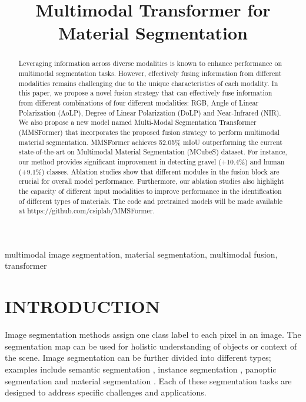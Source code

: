 \documentclass{article}
\title{Multimodal Transformer for Material Segmentation}
\begin{document}
\maketitle


\begin{abstract}
Leveraging information across diverse modalities is known to enhance performance on multimodal segmentation tasks. However, effectively fusing information from different modalities remains challenging due to the unique characteristics of each modality. In this paper, we propose a novel fusion strategy that can effectively fuse information from different combinations of four different modalities: RGB, Angle of Linear Polarization (AoLP), Degree of Linear Polarization (DoLP) and Near-Infrared (NIR). We also propose a new model named Multi-Modal Segmentation Transformer (MMSFormer) that incorporates the proposed fusion strategy to perform multimodal material segmentation. MMSFormer achieves 52.05\% mIoU outperforming the current state-of-the-art on Multimodal Material Segmentation (MCubeS) dataset. For instance, our method provides significant improvement in detecting gravel (+10.4\%) and human (+9.1\%) classes. Ablation studies show that different modules in the fusion block are crucial for overall model performance. Furthermore, our ablation studies also highlight the capacity of different input modalities to improve performance in the identification of different types of materials. The code and pretrained models will be made available at https://github.com/csiplab/MMSFormer.  

\end{abstract}
\begin{keywords}
multimodal image segmentation, material segmentation, multimodal fusion, transformer
\end{keywords}


\section{INTRODUCTION}
Image segmentation \cite{minaee2021image, cheng2001color} methods assign one class label to each pixel in an image. The segmentation map can be used for holistic understanding of objects or context of the scene. Image segmentation can be further divided into different types; examples include semantic segmentation \cite{guo2018semseg, wang2018semseg2}, instance segmentation \cite{hafiz2020instanceseg, gu2022instanceseg2}, panoptic segmentation \cite{kirillov2019panoptic, elharrouss2021panoptic2} and material segmentation \cite{Liang2022MCubeS, upchurch2022dense}. Each of these segmentation tasks are designed to address specific challenges and applications. 
\end{document}
